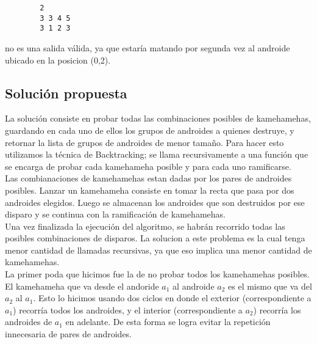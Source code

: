         \begin{verbatim}
        2
        3 3 4 5
        3 1 2 3
        \end{verbatim}
        
        no es una salida válida, ya que estaría matando por segunda vez al androide ubicado en la posicion (0,2). \\
        

    \subsection{Solución propuesta}

    La solución consiste en probar todas las combinaciones posibles de kamehamehas, guardando en cada uno de ellos los grupos de androides a quienes destruye, y retornar la lista de grupos de androides de menor tamaño. Para hacer esto utilizamos la técnica de Backtracking; se llama recursivamente a una función que se encarga de probar cada kamehameha posible y para cada uno ramificarse. \\

    Las combianaciones de kamehamehas estan dadas por los pares de androides posibles. Lanzar un kamehameha consiste en tomar la recta que pasa por dos androides elegidos. Luego se almacenan los androides que son destruidos por ese disparo y se continua con la ramificación de kamehamehas. \\

    Una vez finalizada la ejecución del algoritmo, se habrán recorrido todas las posibles combinaciones de disparos. La solucion a este problema es la cual tenga menor cantidad de llamadas recursivas, ya que eso implica una menor cantidad de kamehamehas. \\

    La primer poda que hicimos fue la de no probar todos los kamehamehas posibles. El kamehameha que va desde el andoride $a_1$ al androide $a_2$ es el mismo que va del $a_2$ al $a_1$. Esto lo hicimos usando dos ciclos en donde el exterior (correspondiente a $a_1$) recorría todos los androides, y el interior (correspondiente a $a_2$) recorría los androides de $a_1$ en adelante. De esta forma se logra evitar la repetición innecesaria de pares de androides. \\

